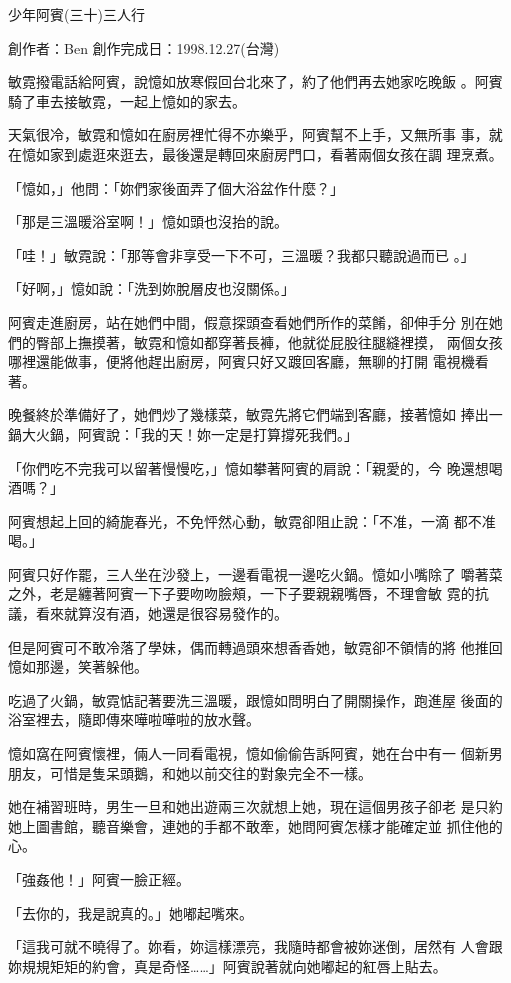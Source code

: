 



少年阿賓(三十)三人行

創作者：Ben
創作完成日：1998.12.27(台灣)


敏霓撥電話給阿賓，說憶如放寒假回台北來了，約了他們再去她家吃晚飯
。阿賓騎了車去接敏霓，一起上憶如的家去。

天氣很冷，敏霓和憶如在廚房裡忙得不亦樂乎，阿賓幫不上手，又無所事
事，就在憶如家到處逛來逛去，最後還是轉回來廚房門口，看著兩個女孩在調
理烹煮。

「憶如，」他問：「妳們家後面弄了個大浴盆作什麼？」

「那是三溫暖浴室啊！」憶如頭也沒抬的說。

「哇！」敏霓說：「那等會非享受一下不可，三溫暖？我都只聽說過而已
。」

「好啊，」憶如說：「洗到妳脫層皮也沒關係。」

阿賓走進廚房，站在她們中間，假意探頭查看她們所作的菜餚，卻伸手分
別在她們的臀部上撫摸著，敏霓和憶如都穿著長褲，他就從屁股往腿縫裡摸，
兩個女孩哪裡還能做事，便將他趕出廚房，阿賓只好又踱回客廳，無聊的打開
電視機看著。

晚餐終於準備好了，她們炒了幾樣菜，敏霓先將它們端到客廳，接著憶如
捧出一鍋大火鍋，阿賓說：「我的天！妳一定是打算撐死我們。」

「你們吃不完我可以留著慢慢吃，」憶如攀著阿賓的肩說：「親愛的，今
晚還想喝酒嗎？」

阿賓想起上回的綺旎春光，不免怦然心動，敏霓卻阻止說：「不准，一滴
都不准喝。」

阿賓只好作罷，三人坐在沙發上，一邊看電視一邊吃火鍋。憶如小嘴除了
嚼著菜之外，老是纏著阿賓一下子要吻吻臉頰，一下子要親親嘴唇，不理會敏
霓的抗議，看來就算沒有酒，她還是很容易發作的。

但是阿賓可不敢冷落了學妹，偶而轉過頭來想香香她，敏霓卻不領情的將
他推回憶如那邊，笑著躲他。

吃過了火鍋，敏霓惦記著要洗三溫暖，跟憶如問明白了開關操作，跑進屋
後面的浴室裡去，隨即傳來嘩啦嘩啦的放水聲。

憶如窩在阿賓懷裡，倆人一同看電視，憶如偷偷告訴阿賓，她在台中有一
個新男朋友，可惜是隻呆頭鵝，和她以前交往的對象完全不一樣。

她在補習班時，男生一旦和她出遊兩三次就想上她，現在這個男孩子卻老
是只約她上圖書館，聽音樂會，連她的手都不敢牽，她問阿賓怎樣才能確定並
抓住他的心。

「強姦他！」阿賓一臉正經。

「去你的，我是說真的。」她嘟起嘴來。

「這我可就不曉得了。妳看，妳這樣漂亮，我隨時都會被妳迷倒，居然有
人會跟妳規規矩矩的約會，真是奇怪……」阿賓說著就向她嘟起的紅唇上貼去。

